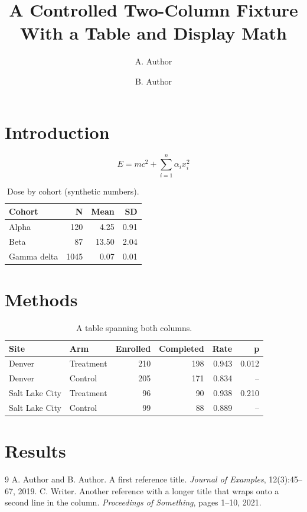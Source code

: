 \documentclass[twocolumn,10pt]{article}
\title{A Controlled Two-Column Fixture With a Table and Display Math}
\author{A. Author \and B. Author}
\begin{document}
\maketitle
\begin{abstract}\lipsum[1]\end{abstract}
\section{Introduction}
\lipsum[2-3]
\begin{equation} E = mc^2 + \sum_{i=1}^{n} \alpha_i x_i^2 \end{equation}
\lipsum[4]
\begin{table}[t]\centering\caption{Dose by cohort (synthetic numbers).}
\begin{tabular}{lrrr}\toprule
Cohort & N & Mean & SD \\ \midrule
Alpha & 120 & 4.25 & 0.91 \\
Beta & 87 & 13.50 & 2.04 \\
Gamma delta & 1045 & 0.07 & 0.01 \\ \bottomrule
\end{tabular}\end{table}
\section{Methods}
\lipsum[5-8]
\begin{table}[t]\centering\caption{A table spanning both columns.}
\begin{tabular}{llrrrr}\toprule
Site & Arm & Enrolled & Completed & Rate & p \\ \midrule
Denver & Treatment & 210 & 198 & 0.943 & 0.012 \\
Denver & Control & 205 & 171 & 0.834 & -- \\
Salt Lake City & Treatment & 96 & 90 & 0.938 & 0.210 \\
Salt Lake City & Control & 99 & 88 & 0.889 & -- \\ \bottomrule
\end{tabular}\end{table}
\section{Results}
\lipsum[9-14]
\begin{thebibliography}{9}
 A. Author and B. Author. A first reference title. \emph{Journal of Examples}, 12(3):45--67, 2019.
 C. Writer. Another reference with a longer title that wraps onto a second line in the column. \emph{Proceedings of Something}, pages 1--10, 2021.
\end{thebibliography}
\end{document}
